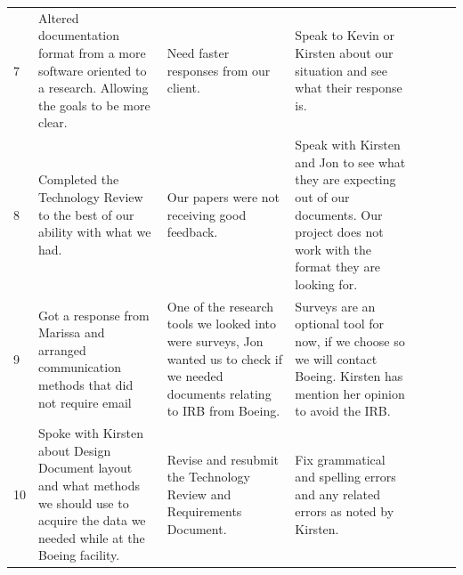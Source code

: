 \documentclass[onecolumn, draftclsnofoot,10pt, compsoc]{IEEEtran}
\begin{document}
\begin{table}[]
\begin{tabular}{|l|p{0.3\linewidth}|p{0.3\linewidth}|p{0.3\linewidth}|p{0.3\linewidth}}
7    & Altered documentation format from a more software oriented to a research. Allowing the goals to be more clear.                                                        & Need faster responses from our client.                                                                                            & Speak to Kevin or Kirsten about our situation and see what their response is.                                                                   &  \\ \cline{1-4}
8    & Completed the Technology Review to the best of our ability with what we had.                                                                                          & Our papers were not receiving good feedback.                                                                                      & Speak with Kirsten and Jon to see what they are expecting out of our documents. Our project does not work with the format they are looking for. &  \\ \cline{1-4}
9    & Got a response from Marissa and arranged communication methods that did not require email                                                                             & One of the research tools we looked into were surveys, Jon wanted us to check if we needed documents relating to IRB from Boeing. & Surveys are an optional tool for now, if we choose so we will contact Boeing. Kirsten has mention her opinion to avoid the IRB.                 &  \\ \cline{1-4}
10   & Spoke with Kirsten about Design Document layout and what methods we should use to acquire the data we needed while at the Boeing facility.                            & Revise and resubmit the Technology Review and Requirements Document.                                                              & Fix grammatical and spelling errors and any related errors as noted by Kirsten.                                                                 &  \\ \cline{1-4}
\end{tabular}
\end{table}



\end{document}
